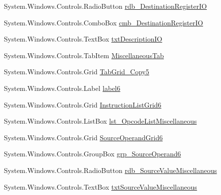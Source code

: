 \begin{DoxyCompactItemize}
\item 
System.\+Windows.\+Controls.\+Radio\+Button \hyperlink{class_c_p_u___o_s___simulator_1_1_instructions_window_a507ebe0998697ce8b2345fac2d9498a1}{rdb\+\_\+\+Destination\+Register\+I\+O}
\item 
System.\+Windows.\+Controls.\+Combo\+Box \hyperlink{class_c_p_u___o_s___simulator_1_1_instructions_window_a821452c6d5ab7be60996d3171a2d4cf1}{cmb\+\_\+\+Destination\+Register\+I\+O}
\item 
System.\+Windows.\+Controls.\+Text\+Box \hyperlink{class_c_p_u___o_s___simulator_1_1_instructions_window_a278020eeca6ae302ab5530cca856acde}{txt\+Description\+I\+O}
\item 
System.\+Windows.\+Controls.\+Tab\+Item \hyperlink{class_c_p_u___o_s___simulator_1_1_instructions_window_ab7e1bbdc8bb2830d39fb9a4339aa27f2}{Miscellaneous\+Tab}
\item 
System.\+Windows.\+Controls.\+Grid \hyperlink{class_c_p_u___o_s___simulator_1_1_instructions_window_a495a21e0e96f26f87d3e379ab286256b}{Tab\+Grid\+\_\+\+Copy5}
\item 
System.\+Windows.\+Controls.\+Label \hyperlink{class_c_p_u___o_s___simulator_1_1_instructions_window_a23cbea70a5e1ab92348a9569f362db07}{label6}
\item 
System.\+Windows.\+Controls.\+Grid \hyperlink{class_c_p_u___o_s___simulator_1_1_instructions_window_a6c86a044f242ee64f312f0105bac6d36}{Instruction\+List\+Grid6}
\item 
System.\+Windows.\+Controls.\+List\+Box \hyperlink{class_c_p_u___o_s___simulator_1_1_instructions_window_a3ac59be147d3323d2b485551b3a3640a}{lst\+\_\+\+Opcode\+List\+Miscellaneous}
\item 
System.\+Windows.\+Controls.\+Grid \hyperlink{class_c_p_u___o_s___simulator_1_1_instructions_window_a1036ae92003998bc7e7062a73358adec}{Source\+Operand\+Grid6}
\item 
System.\+Windows.\+Controls.\+Group\+Box \hyperlink{class_c_p_u___o_s___simulator_1_1_instructions_window_a46c1f50385d01108637e574343a99bfd}{grp\+\_\+\+Source\+Operand6}
\item 
System.\+Windows.\+Controls.\+Radio\+Button \hyperlink{class_c_p_u___o_s___simulator_1_1_instructions_window_ae6e33f7879251b63282f5d3eaa693507}{rdb\+\_\+\+Source\+Value\+Miscellaneous}
\item 
System.\+Windows.\+Controls.\+Text\+Box \hyperlink{class_c_p_u___o_s___simulator_1_1_instructions_window_a555d604d5869d89442a35900abc35914}{txt\+Source\+Value\+Miscellaneous}
\item 

\end{DoxyCompactItemize}
